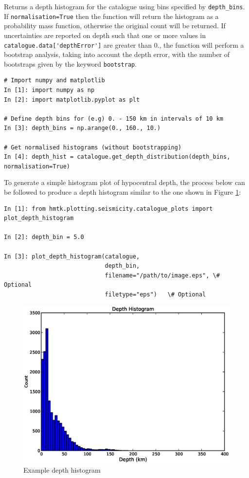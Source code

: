 \begin{itemize}
Returns a depth histogram for the catalogue using bins specified by \verb=depth_bins=. If \verb;normalisation=True; then the function will return the histogram as a probability mass function, otherwise the original count will be returned. If uncertainties are reported on depth such that one or more values in \\ \verb=catalogue.data['depthError']= are greater than 0., the function will perform a bootstrap analysis, taking into account the depth error, with the number of bootstraps given by the keyword \verb=bootstrap=. 

\begin{Verbatim}[frame=single, commandchars=\\\{\}, fontsize=\scriptsize, samepage=true]
# Import numpy and matplotlib
In [1]: import numpy as np
In [2]: import matplotlib.pyplot as plt

# Define depth bins for (e.g) 0. - 150 km in intervals of 10 km
In [3]: depth_bins = np.arange(0., 160., 10.)

# Get normalised histograms (without bootstrapping)
In [4]: depth_hist = catalogue.get_depth_distribution(depth_bins, normalisation=True)
\end{Verbatim}

To generate a simple histogram plot of hypocentral depth, the process below can be followed to produce a depth histogram similar to the one shown in Figure \ref{fig:simple_depth_hist}:

\begin{Verbatim}[frame=single, commandchars=\\\{\}, fontsize=\scriptsize, samepage=true]
In [1]: from hmtk.plotting.seismicity.catalogue_plots import plot_depth_histogram

In [2]: depth_bin = 5.0

In [3]: plot_depth_histogram(catalogue,
                             depth_bin,
                             filename="/path/to/image.eps", \# Optional
                             filetype="eps")   \# Optional
\end{Verbatim}
\begin{figure}[htb]
  \centering
      \includegraphics[trim=10mm 8mm 10mm 10mm, clip, width=12cm]{./figures/simple_depth_histogram.eps}
  \caption{Example depth histogram}
  \label{fig:simple_depth_hist}
\end{figure}


\end{itemize}
